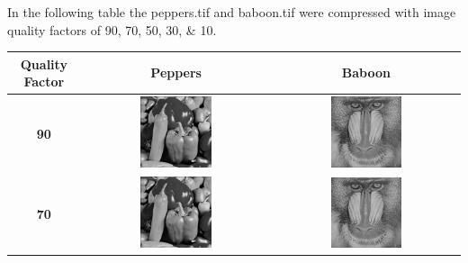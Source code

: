 \documentclass{article}
\begin{document}
\newpage
In the following table the peppers.tif and baboon.tif were compressed with
image quality factors of 90, 70, 50, 30, \& 10. 

\begin{center}
\hspace*{-2.5cm}
\begin{tabular}{@{}c|c|c}
\textbf{Quality Factor} & \textbf{Peppers} & \textbf{Baboon} \\  
\hline
\textbf{90} & 
\includegraphics[width=0.4\textwidth]{pep90}
&
\includegraphics[width=0.4\textwidth]{bab90}
\\ \hline
\textbf{70} & 
\includegraphics[width=0.4\textwidth]{pep70}
&
\includegraphics[width=0.4\textwidth]{bab70}

\end{tabular}
\end{center}
\end{document}
